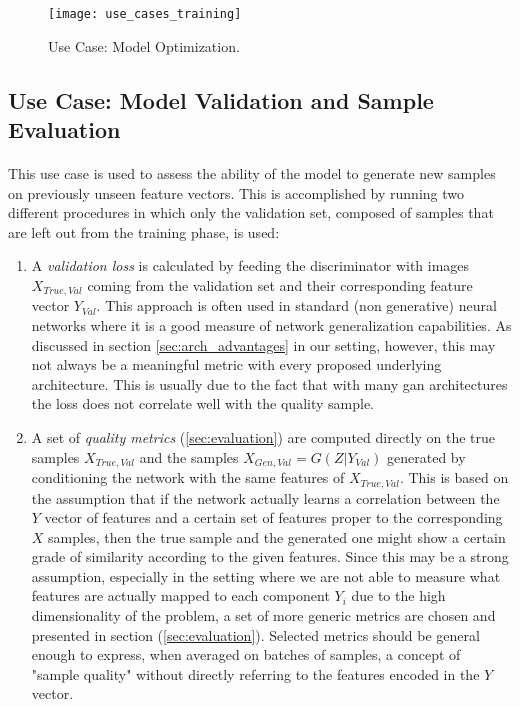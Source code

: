 \begin{figure}[h!]
	\begin{center}
		\texttt{[image: use\_cases\_training]}
	\end{center}
	
	\captionsetup{width=\linewidth}
	\caption[Use Case: Model Optimization]{Use Case: Model Optimization.}
	\label{fig:usecase_train}
\end{figure}



\subsection{Use Case: Model Validation and Sample Evaluation}
\label{sec:usecase_valid}
\paragraph{} This use case is used to assess the ability of the model to generate new samples on previously unseen feature vectors. This is accomplished by running two different procedures in which only the validation set, composed of samples that are left out from the training phase, is used:
\begin{enumerate}
	\item A \textit{validation loss} is calculated by feeding the discriminator with images $X_{True, Val}$ coming from the validation set and their corresponding feature vector $Y_{Val}$. This approach is often used in standard (non generative) neural networks where it is a good measure of network generalization capabilities. As discussed in section \ref{sec:arch_advantages} in our setting, however, this may not always be a meaningful metric with every proposed underlying architecture. This is usually due to the fact that with many \gls{gan} architectures the loss does not correlate well with the quality sample. %
	\item  A set of \textit{quality metrics} (\ref{sec:evaluation}) are computed directly on the true samples $X_{True, Val}$ and the samples $X_{Gen, Val} = G(Z | Y_{Val}) $ generated by conditioning the network with the same features of $X_{True, Val}$. This is based on the assumption that if the network actually learns a correlation between the $Y$ vector of features and a certain set of features proper to the corresponding $X$ samples, then the true sample and the generated one might show a certain grade of similarity according to the given features. Since this may be a strong assumption, especially in the setting where we are not able to measure what features are actually mapped to each component %
	 $Y_i$ due to the high dimensionality of the problem, a set of more generic metrics are chosen and presented in section (\ref{sec:evaluation}). Selected metrics should be general enough to express, when averaged on batches of samples, a concept of "sample quality" without directly referring to the features encoded in the $Y$ vector.
\end{enumerate}

